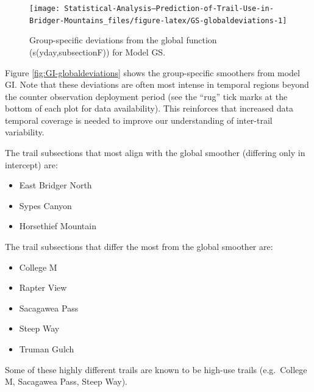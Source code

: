 \documentclass[
]{book}
\providecommand{\tightlist}{%
  \setlength{\itemsep}{0pt}\setlength{\parskip}{0pt}}
\begin{document}
\begin{figure}

{\centering \texttt{[image: Statistical-Analysis--Prediction-of-Trail-Use-in-Bridger-Mountains\_files/figure-latex/GS-globaldeviations-1]} 

}

\caption{Group-specific deviations from the global function (s(yday,subsectionF)) for Model GS.}\label{fig:GS-globaldeviations}
\end{figure}

Figure \ref{fig:GI-globaldeviations} shows the group-specific smoothers from model GI. Note that these deviations are often most intense in temporal regions beyond the counter observation deployment period (see the ``rug'' tick marks at the bottom of each plot for data availability). This reinforces that increased data temporal coverage is needed to improve our understanding of inter-trail variability.

The trail subsections that most align with the global smoother (differing only in intercept) are:

\begin{itemize}
\tightlist
\item
  East Bridger North
\item
  Sypes Canyon
\item
  Horsethief Mountain
\end{itemize}

The trail subsections that differ the most from the global smoother are:

\begin{itemize}
\tightlist
\item
  College M
\item
  Rapter View
\item
  Sacagawea Pass
\item
  Steep Way
\item
  Truman Gulch
\end{itemize}

Some of these highly different trails are known to be high-use trails (e.g.~College M, Sacagawea Pass, Steep Way).
\end{document}
